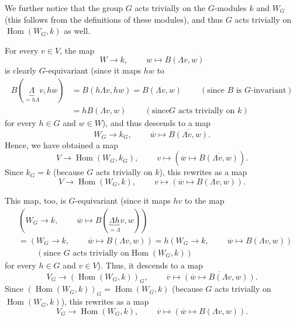 \documentclass
[numbers=enddot,12pt,final,onecolumn,german,notitlepage]{scrartcl}%
\theoremstyle{definition}
\begin{document}
We further notice that the group $G$ acts trivially on the $G$-modules $k$ and
$W_{G}$ (this follows from the definitions of these modules), and thus $G$
acts trivially on $\operatorname*{Hom}\left(  W_{G},k\right)  $ as well.

For every $v\in V$, the map%
\[
W\rightarrow k,\ \ \ \ \ \ \ \ \ \ w\mapsto B\left(  \Lambda v,w\right)
\]
is clearly $G$-equivariant (since it maps $hw$ to%
\begin{align*}
B\left(  \underbrace{\Lambda}_{=h\Lambda}v,hw\right)   &  =B\left(  h\Lambda
v,hw\right)  =B\left(  \Lambda v,w\right)  \ \ \ \ \ \ \ \ \ \ \left(
\text{since }B\text{ is }G\text{-invariant}\right) \\
&  =hB\left(  \Lambda v,w\right)  \ \ \ \ \ \ \ \ \ \ \left(  \text{since
}G\text{ acts trivially on }k\right)
\end{align*}
for every $h\in G$ and $w\in W$), and thus descends to a map%
\[
W_{G}\rightarrow k_{G},\ \ \ \ \ \ \ \ \ \ \overline{w}\mapsto\overline
{B\left(  \Lambda v,w\right)  }.
\]
Hence, we have obtained a map%
\[
V\rightarrow\operatorname*{Hom}\left(  W_{G},k_{G}\right)
,\ \ \ \ \ \ \ \ \ \ v\mapsto\left(  \overline{w}\mapsto\overline{B\left(
\Lambda v,w\right)  }\right)  .
\]
Since $k_{G}=k$ (because $G$ acts trivially on $k$), this rewrites as a map%
\[
V\rightarrow\operatorname*{Hom}\left(  W_{G},k\right)
,\ \ \ \ \ \ \ \ \ \ v\mapsto\left(  \overline{w}\mapsto B\left(  \Lambda
v,w\right)  \right)  .
\]


This map, too, is $G$-equivariant (since it maps $hv$ to the map%
\begin{align*}
&  \left(  W_{G}\rightarrow k,\ \ \ \ \ \ \ \ \ \ \overline{w}\mapsto B\left(
\underbrace{\Lambda h}_{=\Lambda}v,w\right)  \right) \\
&  =\left(  W_{G}\rightarrow k,\ \ \ \ \ \ \ \ \ \ \overline{w}\mapsto
B\left(  \Lambda v,w\right)  \right)  =h\left(  W_{G}\rightarrow
k,\ \ \ \ \ \ \ \ \ \ \overline{w}\mapsto B\left(  \Lambda v,w\right)  \right)
\\
&  \ \ \ \ \ \ \ \ \ \ \left(  \text{since }G\text{ acts trivially on
}\operatorname*{Hom}\left(  W_{G},k\right)  \right)
\end{align*}
for every $h\in G$ and $v\in V$). Thus, it descends to a map%
\[
V_{G}\rightarrow\left(  \operatorname*{Hom}\left(  W_{G},k\right)  \right)
_{G},\ \ \ \ \ \ \ \ \ \ \overline{v}\mapsto\overline{\left(  \overline
{w}\mapsto B\left(  \Lambda v,w\right)  \right)  }.
\]
Since $\left(  \operatorname*{Hom}\left(  W_{G},k\right)  \right)
_{G}=\operatorname*{Hom}\left(  W_{G},k\right)  $ (because $G$ acts trivially
on $\operatorname*{Hom}\left(  W_{G},k\right)  $), this rewrites as a map%
\[
V_{G}\rightarrow\operatorname*{Hom}\left(  W_{G},k\right)
,\ \ \ \ \ \ \ \ \ \ \overline{v}\mapsto\left(  \overline{w}\mapsto B\left(
\Lambda v,w\right)  \right)  .
\]
\end{document}
